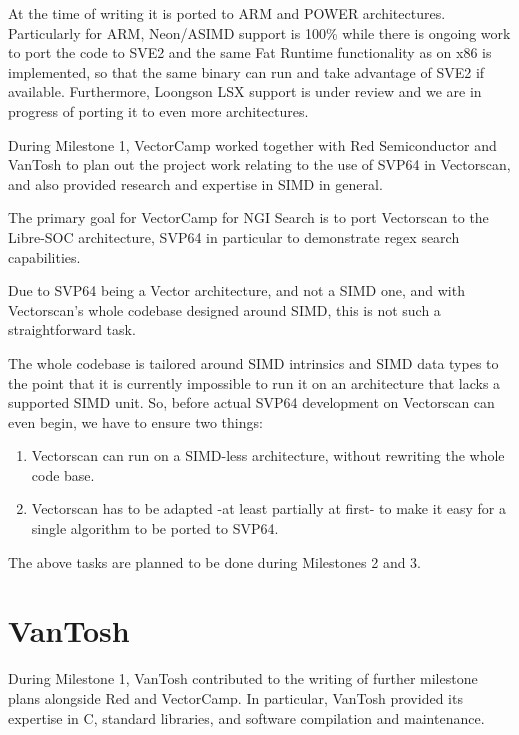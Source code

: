 At the time of writing it is ported
to \acrshort{ARM} and \acrshort{POWER} architectures.
Particularly for \acrshort{ARM}, Neon/\acrshort{ASIMD} support
is 100\% while there is ongoing work to port the code to \acrshort{SVE2} and
the same Fat Runtime functionality as on x86 is implemented,
so that the same binary can run and take advantage of \acrshort{SVE2} if available.
Furthermore, Loongson \acrshort{LSX} support is under review and we are in progress of
porting it to even more architectures.

During Milestone 1, VectorCamp worked together with Red Semiconductor and VanTosh to plan out
the project work relating to the use of \acrshort{SVP64} in Vectorscan, and also provided
research and expertise in \acrshort{SIMD} in general.

The primary goal for VectorCamp for \acrshort{NGI} Search is to port
Vectorscan to the Libre-SOC architecture, \acrshort{SVP64} in particular to demonstrate
regex search capabilities.

Due to \acrshort{SVP64} being a Vector architecture,
and not a \acrshort{SIMD} one, and with Vectorscan’s whole codebase designed around \acrshort{SIMD},
this is not such a straightforward task.

The whole codebase is tailored around \acrshort{SIMD} intrinsics and \acrshort{SIMD} data types to
the point that it is currently impossible to run it on an architecture that
lacks a supported \acrshort{SIMD} unit. So, before actual \acrshort{SVP64} development on Vectorscan
can even begin, we have to ensure two things:

\begin{enumerate}
  \item Vectorscan can run on a \acrshort{SIMD}-less architecture, without rewriting
   the whole code base.
  \item Vectorscan has to be adapted -at least partially at first- to make it easy
   for a single algorithm to be ported to \acrshort{SVP64}.
\end{enumerate}

The above tasks are planned to be done during Milestones 2 and 3.

\section{VanTosh}

During Milestone 1, VanTosh contributed to the writing of further
milestone plans alongside Red and VectorCamp. In particular, VanTosh
provided its expertise in C, standard libraries, and software compilation and
maintenance.


